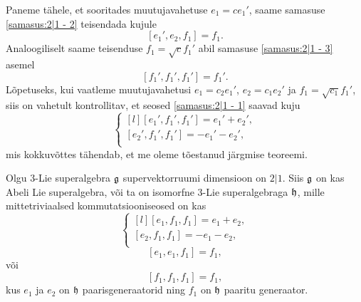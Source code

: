 Paneme tähele, et sooritades muutujavahetuse $e_1 = c e_1'$, saame samasuse
\eqref{samasus:2|1 - 2} teisendada kujule
\[ [e_1', e_2, f_1] = f_1. \]
Analoogiliselt saame teisenduse $f_1 = \sqrt{c} f_1'$ abil samasuse
\eqref{samasus:2|1 - 3} asemel
\[ [f_1', f_1', f_1'] = f_1'. \]
Lõpetuseks, kui vaatleme muutujavahetusi $e_1 = c_2 e_1'$, $e_2 = c_1 e_2'$
ja $f_1 = \sqrt{c_1} f_1'$, siis on vahetult kontrollitav, et seosed
\eqref{samasus:2|1 - 1} saavad kuju
\[ \left\{
    \begin{matrix*}[l]
        [e_1', f_1', f_1'] = e_1' + e_2', \\
        [e_2', f_1', f_1'] = -e_1' - e_2', \\
    \end{matrix*}
\right. \]
mis kokkuvõttes tähendab, et me oleme tõestanud järgmise teoreemi.

\begin{thm}
    Olgu $3$-Lie superalgebra $\mathfrak{g}$ supervektorruumi dimensioon on $2|1$.
    Siis $\mathfrak{g}$ on kas Abeli Lie superalgebra, või ta on isomorfne $3$-Lie
    superalgebraga $\mathfrak{h}$, mille mittetriviaalsed kommutatsiooniseosed on kas
    \[ \left\{
        \begin{matrix*}[l]
            [e_1, f_1, f_1] = e_1 + e_2, \\
            [e_2, f_1, f_1] = -e_1 - e_2, \\
        \end{matrix*}
    \right. \]
    \[ [e_1, e_1, f_1] = f_1, \]
    või
    \[ [f_1, f_1, f_1] = f_1, \]
    kus $e_1$ ja $e_2$ on $\mathfrak{h}$ paarisgeneraatorid ning $f_1$ on $\mathfrak{h}$ paaritu
    generaator.
\end{thm}

